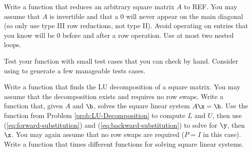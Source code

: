 Write a function that reduces an arbitrary square matrix $A$ to REF.
You may assume that $A$ is invertible and that a $0$ will never appear on the main diagonal (so only use type III row reductions, not type II).
Avoid operating on entries that you know will be $0$ before and after a row operation.
Use at most two nested loops.

Test your function with small test cases that you can check by hand.
Consider using  to generate a few manageable tests cases.
\label{prob:ref-row-reduction}

Write a function that finds the LU decomposition of a square matrix.
You may assume that the decomposition exists and requires no row swaps.
\label{prob:LU-Decomposition}
Write a function that, given $A$ and $\b$, solves the square linear system $A\x = \b$.
Use the function from Problem \ref{prob:LU-Decomposition} to compute $L$ and $U$, then use (\ref{eq:forward-substitution}) and (\ref{eq:backward-substitution}) to solve for $\y$, then $\x$.
You may again assume that no row swaps are required ($P = I$ in this case).
\label{prob:substitute-solve}
Write a function that times different  functions for solving square linear systems.

